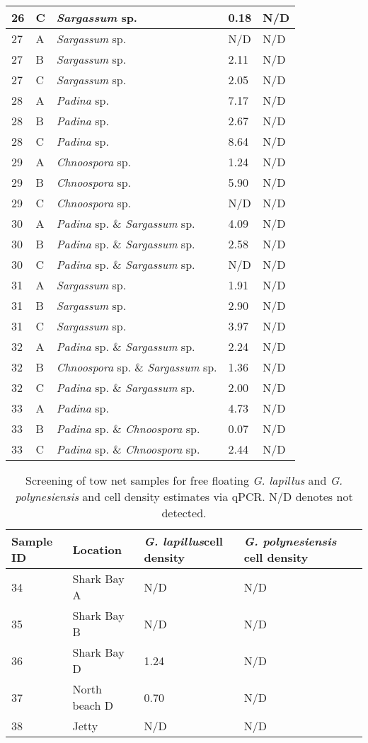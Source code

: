 \documentclass[12pt]{article}
\begin{document}
\begin{longtable}{ | p{2cm} | p{2cm} | p{3cm} | p{3.5cm} | p{3.5cm} | }
\hline
26
&C&\emph{Sargassum} sp.&0.18&N/D\\
\hline
27
&A&\emph{Sargassum} sp.&N/D&N/D\\
\hline
27
&B&\emph{Sargassum} sp.&2.11&N/D\\
\hline
27
&C&\emph{Sargassum} sp.&2.05&N/D\\
\hline
28
&A&\emph{Padina} sp.&7.17&N/D\\
\hline
28
&B&\emph{Padina} sp.&2.67&N/D\\
\hline
28
&C&\emph{Padina} sp.&8.64&N/D\\
\hline
29&A&\emph{Chnoospora }sp.&1.24
&N/D\\
\hline
29&B&\emph{Chnoospora }sp.&5.90
&N/D\\
\hline
29&C&\emph{Chnoospora} sp.&N/D&N/D\\
\hline
30&A&\emph{Padina} sp. \& \emph{Sargassum} sp.&4.09
&N/D\\
\hline
30&B&\emph{Padina} sp. \& \emph{Sargassum} sp.&2.58
&N/D\\
\hline
30&C&\emph{Padina} sp. \& \emph{Sargassum} sp.&N/D&N/D\\
\hline
31&A&\emph{Sargassum} sp.&1.91
&N/D\\
\hline
31&B&\emph{Sargassum} sp.&2.90
&N/D\\
\hline
31&C&\emph{Sargassum} sp.&3.97
&N/D\\
\hline
32&A&\emph{Padina} sp. \& \emph{Sargassum} sp.&2.24
&N/D\\
\hline
32&B&\emph{Chnoospora }sp. \& \emph{Sargassum} sp.&1.36
&N/D\\
\hline
32&C&\emph{Padina} sp. \& \emph{Sargassum} sp.&2.00
&N/D\\
\hline
33&A&\emph{Padina} sp.&4.73
&N/D\\
\hline
33&B&\emph{Padina} sp. \& \emph{Chnoospora} sp.&0.07
&N/D\\
\hline
33&C&\emph{Padina} sp. \& \emph{Chnoospora} sp.&2.44
&N/D\\
\hline
\end{longtable}
\FloatBarrier
\FloatBarrier
\begin{table}
\caption{Screening of tow net samples for free floating \emph{G. lapillus} and \emph{G. polynesiensis} and cell density estimates via qPCR. N/D denotes not detected.}
\label{tbl:NetTable}
\begin{tabular}{ | p{4cm} | p{4cm} |p{4cm} | p{4cm} | }
\hline
\textbf{Sample ID}&\textbf{Location}&\textbf{\emph{G. lapillus}cell density}&\textbf{\emph{G. polynesiensis} cell density}\\
\hline
34&Shark Bay A&N/D&N/D\\ %
\hline
35&Shark Bay B&N/D&N/D\\
\hline
36&Shark Bay D&1.24
&N/D\\
\hline
37&North beach D&0.70
&N/D\\
\hline
38&Jetty&N/D
&N/D\\
\hline
\end{tabular}
\end{table}
\FloatBarrier
\newpage
\end{document}
